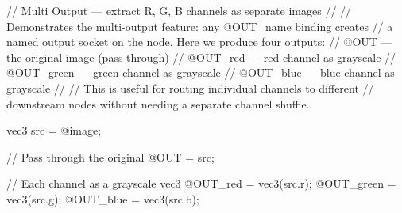 // Multi Output — extract R, G, B channels as separate images
//
// Demonstrates the multi-output feature: any @OUT_name binding creates
// a named output socket on the node. Here we produce four outputs:
//   @OUT       — the original image (pass-through)
//   @OUT_red   — red channel as grayscale
//   @OUT_green — green channel as grayscale
//   @OUT_blue  — blue channel as grayscale
//
// This is useful for routing individual channels to different
// downstream nodes without needing a separate channel shuffle.

vec3 src = @image;

// Pass through the original
@OUT = src;

// Each channel as a grayscale vec3
@OUT_red   = vec3(src.r);
@OUT_green = vec3(src.g);
@OUT_blue  = vec3(src.b);
